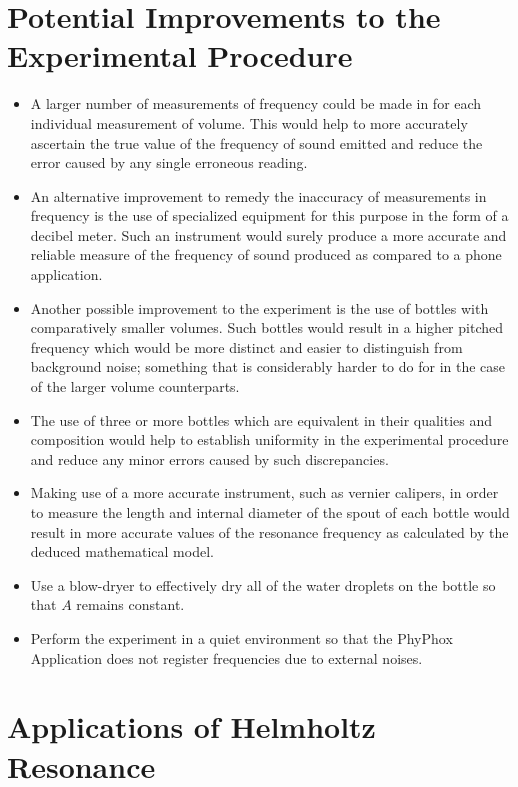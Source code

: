 \documentclass[10pt, a4paper]{article}
\begin{document}
\section*{Potential Improvements to the Experimental Procedure}
\begin{itemize}
    \item A larger number of measurements of frequency could be made in for each individual measurement of volume. This would help to more accurately ascertain the true value of the frequency of sound emitted and reduce the error caused by any single erroneous reading.
    \item An alternative improvement to remedy the inaccuracy of measurements in frequency is the use of specialized equipment for this purpose in the form of a decibel meter. Such an instrument would surely produce a more accurate and reliable measure of the frequency of sound produced as compared to a phone application. 
    \item Another possible improvement to the experiment is the use of bottles with comparatively smaller volumes. Such bottles would result in a higher pitched frequency which would be more distinct and easier to distinguish from background noise; something that is considerably harder to do for in the case of the larger volume counterparts.
    \item The use of three or more bottles which are equivalent in their qualities and composition would help to establish uniformity in the experimental procedure and reduce any minor errors caused by such discrepancies.
    \item Making use of a more accurate instrument, such as vernier calipers, in order to measure the length and internal diameter of the spout of each bottle would result in more accurate values of the resonance frequency as calculated by the deduced mathematical model.
    \item Use a blow-dryer to effectively dry all of the water droplets on the bottle so that $A$ remains constant.
    \item Perform the experiment in a quiet environment so that the PhyPhox Application does not register frequencies due to external noises.
\end{itemize}

\section*{Applications of Helmholtz Resonance}
\end{document}
